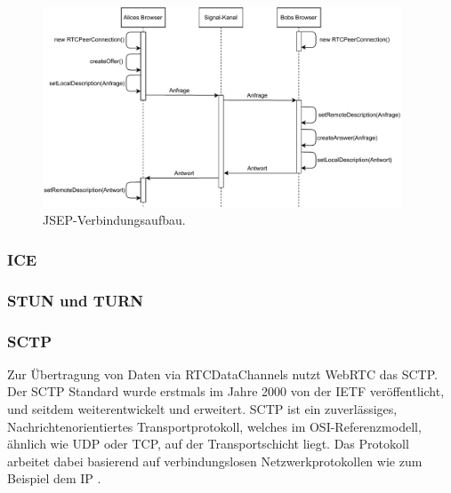 \begin{figure}[h]
\centering
\includegraphics[width=0.95\textwidth]{bilder/PDF_SVG/JSEP.pdf}
\caption{\acs{JSEP}-Verbindungsaufbau.}
\label{fig:jsep}
\end{figure}

\subsubsection{ICE}
\subsubsection{STUN und TURN}
\subsubsection{SCTP}
Zur Übertragung von Daten via RTCDataChannels nutzt \acs{WebRTC} das \acf{SCTP}. Der \acs{SCTP} Standard wurde erstmals im Jahre 2000 von der \acs{IETF} veröffentlicht, und seitdem weiterentwickelt und erweitert. \acs{SCTP} ist ein zuverlässiges, Nachrichtenorientiertes Transportprotokoll, welches im \acf{OSI}-Referenzmodell, ähnlich wie \acs{UDP} oder \acs{TCP}, auf der Transportschicht liegt. Das Protokoll arbeitet dabei basierend auf verbindungslosen Netzwerkprotokollen wie zum Beispiel dem \acf{IP} \cite{sctpRFC}.\par

